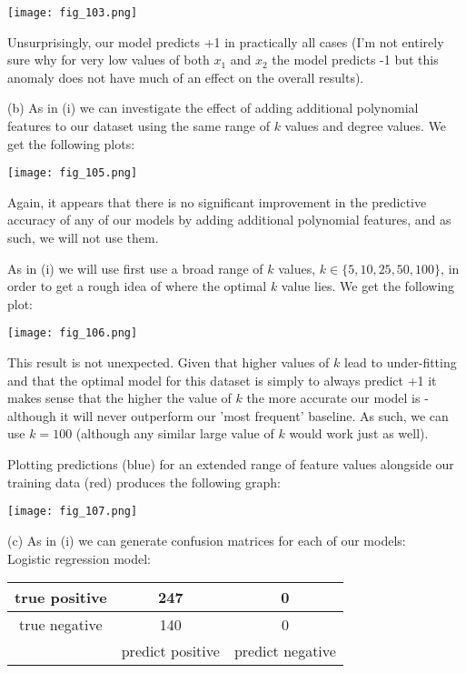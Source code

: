 \documentclass[12pt]{article}
\begin{document}
\begin{center}
    \texttt{[image: fig\_103.png]}
\end{center}

Unsurprisingly, our model predicts +1 in practically all cases (I'm not entirely sure why for very low values of both $x_1$ and $x_2$ the model predicts -1 but this anomaly does not have much of an effect on the overall results).

\noindent (b) As in (i) we can investigate the effect of adding additional polynomial features to our dataset using the same range of $k$ values and degree values. We get the following plots:

\begin{center}
    \texttt{[image: fig\_105.png]}
\end{center}

Again, it appears that there is no significant improvement in the predictive accuracy of any of our models by adding additional polynomial features, and as such, we will not use them.

As in (i) we will use first use a broad range of $k$ values, $k \in \{5, 10, 25, 50, 100\}$, in order to get a rough idea of where the optimal $k$ value lies. We get the following plot:

\begin{center}
    \texttt{[image: fig\_106.png]}
\end{center}

This result is not unexpected. Given that higher values of $k$ lead to under-fitting and that the optimal model for this dataset is simply to always predict +1 it makes sense that the higher the value of $k$ the more accurate our model is - although it will never outperform our 'most frequent' baseline. As such, we can use $k = 100$ (although any similar large value of $k$ would work just as well).

Plotting predictions (blue) for an extended range of feature values alongside our training data (red) produces the following graph:

\begin{center}
    \texttt{[image: fig\_107.png]}
\end{center}

\noindent (c) As in (i) we can generate confusion matrices for each of our models: \\

Logistic regression model:

\begin{center}
    \begin{tabular}{c|c|c|}
        \hline
        true positive & 247 & 0 \\ \hline
        true negative & 140 & 0 \\ \hline
        & predict positive & predict negative \\
    \end{tabular}
\end{center}
\end{document}

